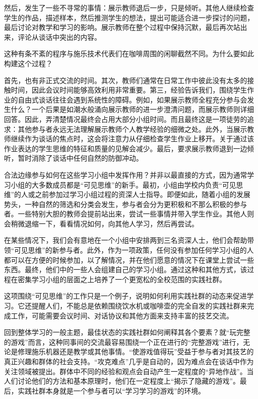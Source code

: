 然后，发生了一些不寻常的事情：展示教师退后一步，只是倾听。其他人继续检查学生的作品，描述样本，然后推测学生的想法，提出可能适合进一步探讨的问题，最后讨论对教学和学习的影响。展示教师在整个过程中保持沉默，最后再次站出来，评论从谈话中突出的内容。

这种有条不紊的程序与施乐技术代表们在咖啡周围的闲聊截然不同。为什么要如此构建这个过程？

首先，也有非正式交流的时间。其次，教师们通常在日常工作中彼此没有太多的接触时间，因此会议时间能够高效利用非常重要。第三，经验告诉我们，围绕学生作业的自由式谈话往往会遇到系统性的障碍。例如，如果展示教师全程充分参与会发生什么？一个后果是如潮水般涌向展示教师的进一步澄清问题，而展示教师则详细回答。因此，弄清楚情况最终会占用大部分小组时间。而且最终这是一项徒劳的追求：其他参与者永远无法理解展示教师个人教学经验的细微之处。此外，当展示教师继续作为谈话的焦点时，这会将注意力从仔细检查学生作业上移开。关于通过该作业表达的学生思维的特征和质量的见解会减少。最后，要求展示教师退到一边倾听，暂时消除了谈话中任何自然的防御冲动。

合法边缘参与如何在这些学习小组中发挥作用？并非以最直接的方式，因为通常学习小组的大多数成员都是“可见思维”的新手。最初，小组由学校内负责“可见思维”的人或之前参加过学习小组过程的资深人士指导。即便如此，随着小组的发展势头，一种自然的筛选和分类会发生，参与者会分为更积极和不那么积极的参与者。一些特别大胆的教师会提前站出来，尝试一些事情并带入学生作业。其他人则会稍微退缩一下，看看情况如何，向其他人学习，然后再尝试。

在某些情况下，我们会有意地在一个小组中安排两到三名资深人士，他们会帮助带领“可见思维”的新参与者。此外，作为一项政策，任何没有参加任何学习小组的人都可以在方便的时候参加，以了解情况，并在他们愿意的情况下在课堂上尝试一些东西。最终，他们中的一些人会组建自己的学习小组。通过这种和其他方式，该过程在密集学习小组的层面之上培养了一个更宽松的全校范围的实践社群。

这项围绕“可见思维”的工作只是一个例子，说明如何利用实践社群的动态来促进学习。它还提醒人们，不能总是依赖围绕饮水机或咖啡壶的完全自发的实践社群来完成工作，可能需要会议时间、对话协议和其他方面来支持丰富的技艺交流。

回到整体学习的一般主题，最佳状态的实践社群如何阐释其各个要素？就“玩完整的游戏”而言，这种同事间的交流最容易围绕一个正在进行的“完整游戏”进行，无论是修理施乐机器还是教学或其他事情。“使游戏值得玩”受益于参与者对其技艺的真正兴趣和群体的社会支持。“攻克难点”几乎是自动的，因为难点会在谈话中作为关注领域被提出。群体中不同的经验和观点会自动产生一定程度的“异地作战”。当人们讨论他们的方法和基本原理时，他们在一定程度上“揭示了隐藏的游戏”。最后，实践社群本身就是一个参与者可以“学习学习的游戏”的环境。

